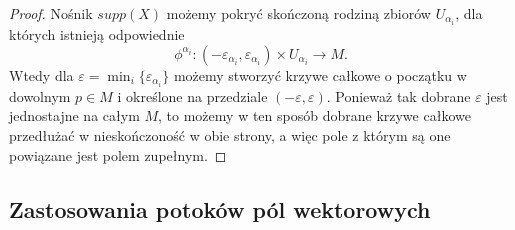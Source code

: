 \begin{proof}
  Nośnik $supp(X)$ możemy pokryć skończoną rodziną zbiorów $U_{\alpha_i}$, dla których istnieją odpowiednie 
  $$\phi^{\alpha_i}:(-\varepsilon_{\alpha_i},\varepsilon_{\alpha_i})\times U_{\alpha_i}\to M.$$
  Wtedy dla $\varepsilon=\min_i\{\varepsilon_{\alpha_i}\}$ możemy stworzyć krzywe całkowe o początku w dowolnym $p\in M$ i określone na przedziale $(-\varepsilon,\varepsilon)$. Ponieważ tak dobrane $\varepsilon$ jest jednostajne na całym $M$, to możemy w ten sposób dobrane krzywe całkowe przedłużać w nieskończoność w obie strony, a więc pole z którym są one powiązane jest polem zupełnym.
\end{proof}

\subsection{Zastosowania potoków pól wektorowych}

